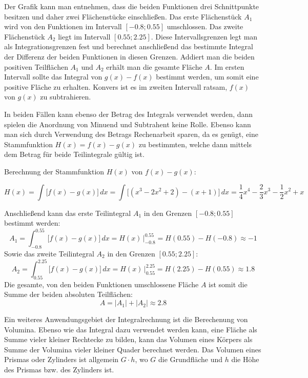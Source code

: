 Der Grafik kann man entnehmen, dass die beiden Funktionen drei Schnittpunkte besitzen und daher zwei Fl\"{a}chenst\"{u}cke einschlie\ss{}en. Das erste Fl\"{a}chenst\"{u}ck $A_1$ wird von den Funktionen im Intervall $[-0.8 ; 0.55]$ umschlossen. Das zweite Fl\"{a}chenst\"{u}ck $A_2$ liegt im Intervall $[0.55 ; 2.25]$. Diese Intervallsgrenzen legt man als Integrationsgrenzen fest und berechnet anschlie\ss{}end das bestimmte Integral der Differenz der beiden Funktionen in diesen Grenzen. Addiert man die beiden positiven Teilfl\"{a}chen $A_1$ und $A_2$ erh\"{a}lt man die gesamte Fl\"{a}che $A$. Im ersten Intervall sollte das Integral von $g(x) - f(x)$ bestimmt werden, um somit eine positive Fl\"{a}che zu erhalten. Konvers ist es im zweiten Intervall ratsam, $f(x)$ von $g(x)$ zu subtrahieren. 

In beiden F\"{a}llen kann ebenso der Betrag des Integrals verwendet werden, dann spielen die Anordnung von Minuend und Subtrahent keine Rolle. Ebenso kann man sich durch Verwendung des Betrags Rechenarbeit sparen, da es gen\"{u}gt, eine Stammfunktion $H(x) = f(x) - g(x)$ zu bestimmten, welche dann mittels dem Betrag f\"{u}r beide Teilintegrale g\"{u}ltig ist.

Berechnung der Stammfunktion $H(x)$ von $f(x) - g(x)$: 

$$H(x) = \int \big[ f(x) - g(x) \big] \, dx = \int \big[ (x^3 - 2x^2 + 2) - (x + 1)\big] \, dx = \frac{1}{4}x^4 - \frac{2}{3}x^3 - \frac{1}{2}x^2 + x$$

\pagebreak

Anschlie\ss{}end kann das erste Teilintegral $A_1$ in den Grenzen $[-0.8 ; 0.55]$ bestimmt werden: $$A_1 = \int_{-0.8}^{0.55} \big[ f(x) - g(x)\big] \, dx = H(x) \, \Big|_{-0.8}^{0.55} = H(0.55) - H(-0.8) \approx -1$$ Sowie das zweite Teilintegral $A_2$ in den Grenzen $[0.55 ; 2.25]$: $$A_2 = \int_{0.55}^{2.25} \big[ f(x) - g(x)\big] \, dx = H(x) \, \Big|_{0.55}^{2.25} = H(2.25) - H(0.55) \approx 1.8$$ Die gesamte, von den beiden Funktionen umschlossene Fl\"{a}che $A$ ist somit die Summe der beiden absoluten Teilfl\"{a}chen: $$A = | A_1 | + | A_2 | \approx 2.8$$


Ein weiteres Anwendungsgebiet der Integralrechnung ist die Berechenung von Volumina. Ebenso wie das Integral dazu verwendet werden kann, eine Fl\"{a}che als Summe vieler kleiner Rechtecke zu bilden, kann das Volumen eines K\"{o}rpers als Summe der Volumina vieler kleiner Quader berechnet werden. Das Volumen eines Prismas oder Zylinders ist allgemein $G \cdot h$, wo $G$ die Grundfl\"{a}che und $h$ die H\"{o}he des Prismas bzw. des Zylinders ist. 

